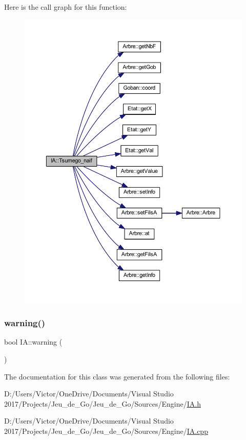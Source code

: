 Here is the call graph for this function\+:
\nopagebreak
\begin{figure}[H]
\begin{center}
\leavevmode
\includegraphics[width=350pt]{class_i_a_a42202360406fe67babfd01a9b7902fd2_cgraph}
\end{center}
\end{figure}
\mbox{\label{class_i_a_a7099f0c1f9a2c0c598975ac0ff6a32bc}} 
\subsubsection{\texorpdfstring{warning()}{warning()}}
{\footnotesize\ttfamily bool I\+A\+::warning (\begin{DoxyParamCaption}{ }\end{DoxyParamCaption})\hspace{0.3cm}{\ttfamily [static]}}



The documentation for this class was generated from the following files\+:\begin{DoxyCompactItemize}
\item 
D\+:/\+Users/\+Victor/\+One\+Drive/\+Documents/\+Visual Studio 2017/\+Projects/\+Jeu\+\_\+de\+\_\+\+Go/\+Jeu\+\_\+de\+\_\+\+Go/\+Sources/\+Engine/\hyperlink{_i_a_8h}{I\+A.\+h}\item 
D\+:/\+Users/\+Victor/\+One\+Drive/\+Documents/\+Visual Studio 2017/\+Projects/\+Jeu\+\_\+de\+\_\+\+Go/\+Jeu\+\_\+de\+\_\+\+Go/\+Sources/\+Engine/\hyperlink{_i_a_8cpp}{I\+A.\+cpp}\end{DoxyCompactItemize}
